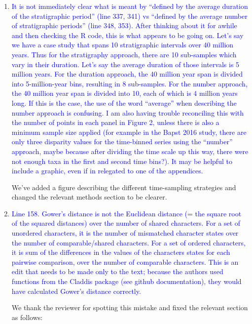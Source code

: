 \documentclass[12pt,letterpaper]{article}
\begin{document}
\begin{enumerate}

\item{\textcolor{blue}{It is not immediately clear what is meant by ``defined by the average duration of the stratigraphic period'' (line 337, 341) vs ``defined by the average number of stratigraphic periods'' (line 348, 353). After thinking about it for awhile and then checking the R code, this is what appears to be going on.
Let's say we have a case study that spans 10 stratigraphic intervals over 40 million years.
Thus for the stratigraphy approach, there are 10 sub-samples which vary in their duration.
Let’s say the average duration of those intervals is 5 million years.
For the duration approach, the 40 million year span is divided into 5-million-year bins, resulting in 8 sub-samples.
For the number approach, the 40 million year span is divided into 10, each of which is 4 million years long.
If this is the case, the use of the word ``average'' when describing the number approach is confusing. I am also having trouble reconciling this with the number of points in each panel in Figure 2, unless there is also a minimum sample size applied (for example in the Bapst 2016 study, there are only three disparity values for the time-binned series using the ``number'' approach, maybe because after dividing the time scale up this way, there were not enough taxa in the first and second time bins?).
It may be helpful to include a graphic, even if in relegated to one of the appendices.}}

We've added a figure describing the different time-sampling strategies and changed the relevant methods section to be clearer. %

\item{\textcolor{blue}{Line 158. Gower's distance is not the Euclidean distance (= the square root of the squared distances) over the number of shared characters. For a set of unordered characters, it is the number of mismatched character states over the number of comparable/shared characters. For a set of ordered characters, it is sum of the differences in the values of the characters states for each pairwise comparison, over the number of comparable characters. This is an edit that needs to be made only to the text; because the authors used functions from the Claddis package (see github documentation), they would have calculated Gower's distance correctly.}}

We thank the reviewer for spotting this mistake and fixed the relevant section as follows:


\end{enumerate}
\end{document}
